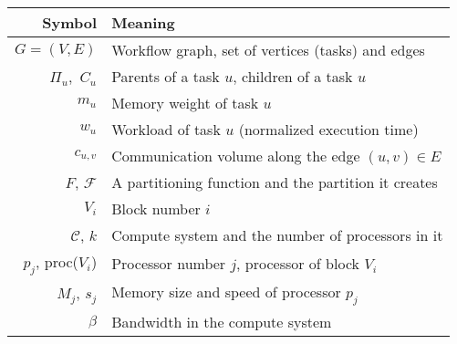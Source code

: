 \documentclass[11pt]{article}
\newcommand{\parents}[1]{\,\Pi_{#1}}
\newcommand{\children}[1]{\,C_{#1}}
\newcommand{\cluster}{\,\mathcal{C}}
\begin{document}
    \begin{table}[h!]
        \begin{center}
            \begin{tabular}{rl}
                \hline
                \textbf{Symbol}                       & \textbf{Meaning}                                               \\
                \hline
                $G = (V, E)$                          & Workflow graph, set of vertices (tasks) and edges              \\
                $\parents{u}$, $\children{u}$         & Parents of a task $u$, children of a task $u$                  \\
                $m_u$                                 & Memory weight of task $u$                                      \\
                $w_u$                                 & Workload of task $u$  (normalized execution time)                 \\
                $c_{u,v}$                             & Communication volume along the edge $(u,v)\in E$               \\
                $F$, $\mathcal{F}$                    & A partitioning function and the partition it creates           \\
                $V_i$                                 & Block number $i$                                               \\ %
                $\cluster$, $k$                    & Compute system and the number of processors in it                 \\
                $p_j$, proc($V_i$)                          & Processor number $j$, processor of block $V_i$                       \\
                $M_j$, $s_j$                               & Memory size and speed of processor $p_j$                                \\
                $\beta$                     & Bandwidth in the compute system                                      \\

\end{tabular}
\end{center}
\end{table}
\end{document}
